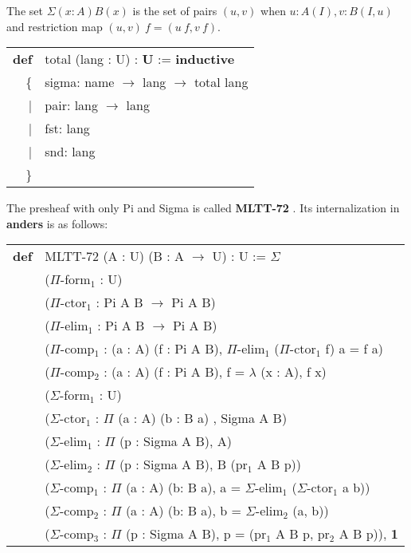 \documentclass[a4paper,UKenglish,cleveref, autoref, thm-restate]{lipics-v2021}
\newcommand{\tabstyle}[0]{\scriptsize\ttfamily\fontseries{l}\selectfont}
\begin{document}
\begin{definition}[Sigma]
The set $\Sigma(x:A)B(x)$ is the set of pairs $(u,v)$ when $u:A(I),v:B(I,u)$ and restriction map $(u,v)\ f=(u\ f,v\ f)$.
\end{definition}
\begin{table}[ht]
\tabstyle
\begin{tabular}{rl}
  \textbf{def} & total (lang : U) : \textbf{U} := \textbf{inductive} \\
            \{ & sigma: name $\rightarrow$ lang $\rightarrow$ total lang \\
             | & pair: lang $\rightarrow$ lang \\
             | & fst: lang \\
             | & snd: lang \\
            \} & \\
\end{tabular}
\end{table}

The presheaf with only Pi and Sigma is called \textbf{MLTT-72} \cite{MLTT72}. Its internalization in \textbf{anders} is as follows:

\begin{table}[ht!]
\tabstyle
\begin{tabular}{rl}
\textbf{def} & MLTT-72 (A : U) (B : A $\rightarrow$ U) : U := $\Sigma$ \\
             & ($\Pi$-form$_1$ : U) \\
             & ($\Pi$-ctor$_1$ : Pi A B $\rightarrow$ Pi A B) \\
             & ($\Pi$-elim$_1$ : Pi A B $\rightarrow$ Pi A B) \\
             & ($\Pi$-comp$_1$ : (a : A) (f : Pi A B), $\Pi$-elim$_1$ ($\Pi$-ctor$_1$ f) a = f a) \\
             & ($\Pi$-comp$_2$ : (a : A) (f : Pi A B), f = $\lambda$ (x : A), f x) \\
             & ($\Sigma$-form$_1$ : U) \\
             & ($\Sigma$-ctor$_1$ : $\Pi$ (a : A) (b : B a) , Sigma A B) \\
             & ($\Sigma$-elim$_1$ : $\Pi$ (p : Sigma A B), A) \\
             & ($\Sigma$-elim$_2$ : $\Pi$ (p : Sigma A B), B (pr$_1$ A B p)) \\
             & ($\Sigma$-comp$_1$ : $\Pi$ (a : A) (b: B a), a = $\Sigma$-elim$_1$ ($\Sigma$-ctor$_1$ a b)) \\
             & ($\Sigma$-comp$_2$ : $\Pi$ (a : A) (b: B a), b = $\Sigma$-elim$_2$ (a, b)) \\
             & ($\Sigma$-comp$_3$ : $\Pi$ (p : Sigma A B), p = (pr$_1$ A B p, pr$_2$ A B p)), \textbf{1}
\end{tabular}
\end{table}
\end{document}
